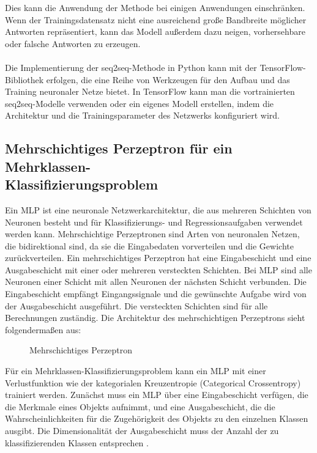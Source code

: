 Dies kann die Anwendung der Methode bei einigen Anwendungen einschränken. 
Wenn der Trainingsdatensatz nicht eine ausreichend große Bandbreite möglicher Antworten repräsentiert, kann das Modell außerdem dazu neigen, vorhersehbare oder falsche Antworten zu erzeugen.\\\\
Die Implementierung der seq2seq-Methode in Python kann mit der TensorFlow-Bibliothek erfolgen, die eine Reihe von Werkzeugen für den Aufbau und das Training neuronaler Netze bietet. 
In TensorFlow kann man die vortrainierten seq2seq-Modelle verwenden oder ein eigenes Modell erstellen, indem die Architektur und die Trainingsparameter des Netzwerks konfiguriert wird. \cite{tensorflow}
\subsection{Mehrschichtiges Perzeptron für ein Mehrklassen-\\Klassifizierungsproblem}
Ein \ac{MLP} ist eine neuronale Netzwerkarchitektur, die aus mehreren Schichten von Neuronen besteht und für Klassifizierungs- und Regressionsaufgaben verwendet werden kann. 
Mehrschichtige Perzeptronen sind Arten von neuronalen Netzen, die bidirektional sind, da sie die Eingabedaten vorverteilen und die Gewichte zurückverteilen. 
Ein mehrschichtiges Perzeptron hat eine Eingabeschicht und eine Ausgabeschicht mit einer oder mehreren versteckten Schichten. 
Bei \ac{MLP} sind alle Neuronen einer Schicht mit allen Neuronen der nächsten Schicht verbunden. 
Die Eingabeschicht empfängt Eingangssignale und die gewünschte Aufgabe wird von der Ausgabeschicht ausgeführt. 
Die versteckten Schichten sind für alle Berechnungen zuständig. 
Die Architektur des mehrschichtigen Perzeptrons sieht folgendermaßen aus:
\begin{figure}[H]
    \centering
    \caption{\label{figure:Mehrschichtiges_Perzeptron}Mehrschichtiges Perzeptron}
\end{figure}
\noindent
Für ein Mehrklassen-Klassifizierungsproblem kann ein \ac{MLP} mit einer Verlustfunktion wie der kategorialen Kreuzentropie (Categorical Crossentropy) trainiert werden. 
Zunächst muss ein \ac{MLP} über eine Eingabeschicht verfügen, die die Merkmale eines Objekts aufnimmt, und eine Ausgabeschicht, die die Wahrscheinlichkeiten für die Zugehörigkeit des Objekts zu den einzelnen Klassen ausgibt. 
Die Dimensionalität der Ausgabeschicht muss der Anzahl der zu klassifizierenden Klassen entsprechen \cite{goodfellow_deep_2016}.
